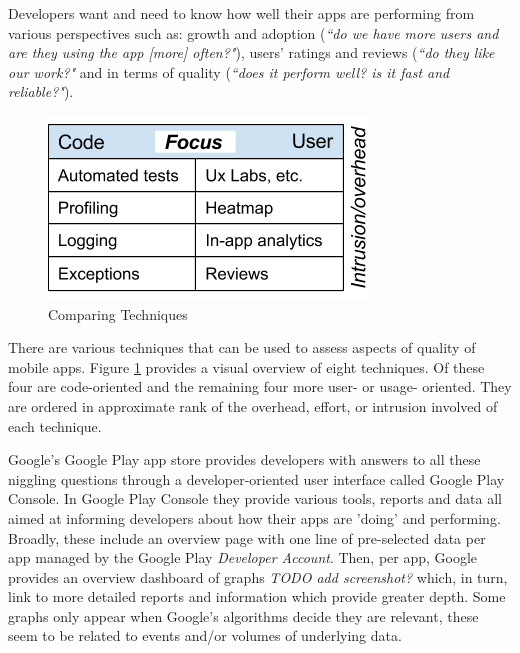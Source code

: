 Developers want and need to know how well their apps are performing from various perspectives such as: growth and adoption (\emph{``do we have more users and are they using the app [more] often?"}), users' ratings and reviews (\emph{``do they like our work?"} and in terms of quality (\emph{``does it perform well? is it fast and reliable?"}). 

\begin{figure}[ht]
    \centering
    \includegraphics{images/ComparingTechniquesRHS.png}
    \caption{Comparing Techniques}
    \label{fig:comparing_techniques}
\end{figure}

There are various techniques that can be used to assess aspects of quality of mobile apps. Figure \ref{fig:comparing_techniques} provides a visual overview of eight techniques. Of these four are code-oriented and the remaining four more user- or usage- oriented. They are ordered in approximate rank of the overhead, effort, or intrusion involved of each technique. %

Google's Google Play app store provides developers with answers to all these niggling questions through a developer-oriented user interface called Google Play Console. 
In Google Play Console they provide various tools, reports and data all aimed at informing developers about how their apps are 'doing' and performing. Broadly, these include an overview page with one line of pre-selected data per app managed by the Google Play \textit{Developer Account}. Then, per app, Google provides an overview dashboard of graphs \emph{TODO add screenshot?} which, in turn, link to more detailed reports and information which provide greater depth. Some graphs only appear when Google's algorithms decide they are relevant, these seem to be related to events and/or volumes of underlying data.


